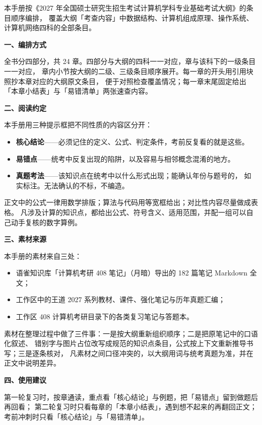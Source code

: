 本手册按《2027 年全国硕士研究生招生考试计算机学科专业基础考试大纲》的条目顺序编排，
覆盖大纲「考查内容」中数据结构、计算机组成原理、操作系统、计算机网络四科的全部条目。

\vspace{6pt}
{\bfseries 一、编排方式}

全书分四部分，共 24 章。四部分与大纲的四科一一对应，章与该科下的一级条目一一对应，
章内小节按大纲的二级、三级条目顺序展开。每一章的开头用引用块照抄本章对应的大纲原文条目，
便于对照检查覆盖情况；每一章末尾固定给出「本章小结表」与「易错清单」两张速查内容。

\vspace{6pt}
{\bfseries 二、阅读约定}

本手册用三种提示框把不同性质的内容区分开：

\begin{itemize}\setlength{\itemsep}{2pt}
\item \textbf{核心结论}——必须记住的定义、公式、判定条件，考前反复看的就是这些。
\item \textbf{易错点}——统考中反复出现的陷阱，以及容易与相邻概念混淆的地方。
\item \textbf{真题考法}——该知识点在统考中以什么形式出现；能确认年份与题号的，
      如实标注。无法确认的不标，不编造。
\end{itemize}

正文中的公式一律用数学排版；算法与代码用等宽框给出；对比性内容尽量做成表格。
凡涉及计算的知识点，都给出公式、符号含义、适用范围，并配一组可以自己动手复核的数字算例。

\vspace{6pt}
{\bfseries 三、素材来源}

本手册的素材来自三处：
\begin{itemize}\setlength{\itemsep}{2pt}
\item 语雀知识库「计算机考研 408 笔记」（月暗）导出的 182 篇笔记 Markdown 全文；
\item 工作区中的王道 2027 系列教材、课件、强化笔记与历年真题汇编；
\item 工作区 408 计算机考研目录下的各类复习笔记与答题本。
\end{itemize}

素材在整理过程中做了三件事：一是按大纲重新组织顺序；二是把原笔记中的口语化叙述、
错别字与图片占位改写成规范的知识点条目，公式按上下文重新推导书写；三是逐条核对，
凡素材之间口径冲突的，以大纲用词与统考真题为准，并在正文中说明差异。

\vspace{6pt}
{\bfseries 四、使用建议}

第一轮复习时，按章通读，重点看「核心结论」与例题，把「易错点」留到做题后再回看；
第二轮复习时只看每章的「本章小结表」，遇到想不起来的再翻回正文；
考前冲刺时只看「核心结论」与「易错清单」。

\vspace{10pt}
